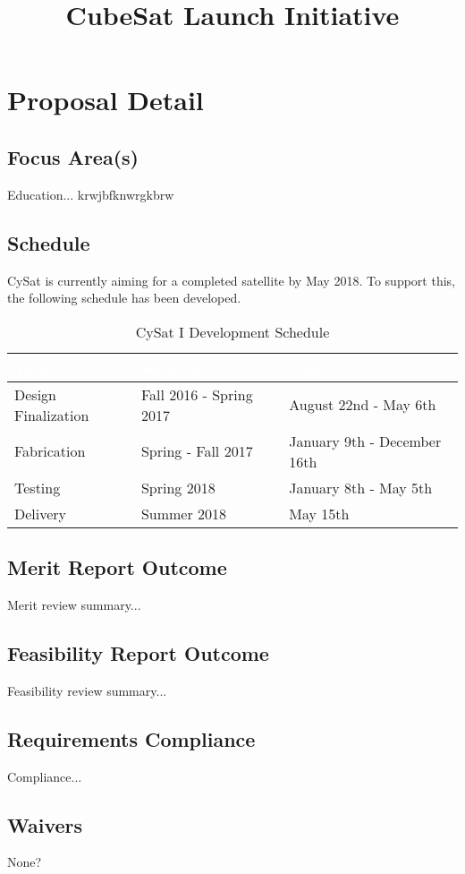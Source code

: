 \documentclass[]            %
{CSLI}                       %
\title{CubeSat Launch Initiative}
\begin{document}
\newpage
\tableofcontents



\newpage
\section{Proposal Detail}
\subsection{Focus Area(s)}
Education... krwjbfknwrgkbrw
\subsection{Schedule}
CySat is currently aiming for a completed satellite by May 2018. To support this, the following schedule has been developed.
\begin{table}[H]
\centering
\caption{CySat I Development Schedule}
\begin{tabular}{| l | l | l |}
\arrayrulecolor{white}
\hline
\rowcolor{gray!80}
\textcolor{white}{\textbf{Task}} & \textcolor{white}{\textbf{Semester(s)}} & \textcolor{white}{\textbf{Dates}} \\ \hline
\rowcolor{gray!10}
Design Finalization & Fall 2016 - Spring 2017& August 22nd - May 6th  \\ \hline
\rowcolor{gray!5}
Fabrication & Spring - Fall 2017 & January 9th - December 16th  \\ \hline
\rowcolor{gray!10}
Testing & Spring 2018 & January 8th - May 5th   \\ \hline
\rowcolor{gray!5}
Delivery & Summer 2018 & May 15th \\ \hline
\end{tabular}
\end{table}

\subsection{Merit Report Outcome}
Merit review summary...
\subsection{Feasibility Report Outcome}
Feasibility review summary...
\subsection{Requirements Compliance}
Compliance...
\subsection{Waivers}
None?
\end{document}
